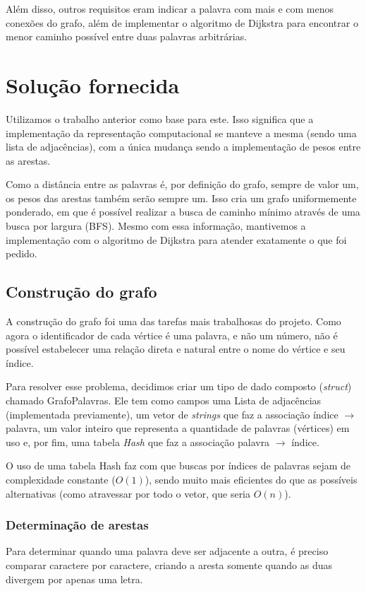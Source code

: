 \documentclass[a4paper, 12pt]{article}
\begin{document}
Além disso, outros requisitos eram indicar a palavra com mais e com menos conexões
do grafo, além de implementar o algoritmo de Dijkstra para encontrar o menor caminho
possível entre duas palavras arbitrárias.
\section{Solução fornecida}
Utilizamos o trabalho anterior como base para este. Isso significa que a implementação
da representação computacional se manteve a mesma (sendo uma lista de adjacências),
com a única mudança sendo a implementação de pesos entre as arestas.

Como a distância entre as palavras é, por definição do grafo, sempre de valor um,
os pesos das arestas também serão sempre um. Isso cria um grafo uniformemente ponderado,
em que é possível realizar a busca de caminho mínimo através de uma busca por largura
(BFS). Mesmo com essa informação, mantivemos a implementação com o algoritmo de
Dijkstra para atender exatamente o que foi pedido.

\subsection{Construção do grafo}
A construção do grafo foi uma das tarefas mais trabalhosas do projeto. Como agora
o identificador de cada vértice é uma palavra, e não um número, não é possível
estabelecer uma relação direta e natural entre o nome do vértice e seu índice.

Para resolver esse problema, decidimos criar um tipo de dado composto (\textit{struct})
chamado GrafoPalavras. Ele tem como campos uma Lista de adjacências (implementada previamente),
um vetor de \textit{strings} que faz a associação índice $\rightarrow$ palavra, um valor inteiro
que representa a quantidade de palavras (vértices) em uso e, por fim, uma tabela \textit{Hash}
que faz a associação palavra $\rightarrow$ índice.

O uso de uma tabela Hash faz com que buscas
por índices de palavras sejam de complexidade constante ($O(1)$), sendo muito mais eficientes
do que as possíveis alternativas (como atravessar por todo o vetor, que seria $O(n)$). 

\subsubsection{Determinação de arestas}
Para determinar quando uma palavra deve ser adjacente a outra, é preciso comparar
caractere por caractere, criando a aresta somente quando as duas divergem por apenas
uma letra.
\end{document}
